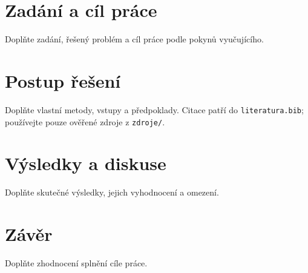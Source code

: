 \documentclass[a4paper,12pt]{article}
\begin{document}
\TitulniStrana

\section{Zadání a cíl práce}
Doplňte zadání, řešený problém a cíl práce podle pokynů vyučujícího.

\section{Postup řešení}
Doplňte vlastní metody, vstupy a předpoklady. Citace patří do
\texttt{literatura.bib}; používejte pouze ověřené zdroje z \texttt{zdroje/}.

\section{Výsledky a diskuse}
Doplňte skutečné výsledky, jejich vyhodnocení a omezení.

\section{Závěr}
Doplňte zhodnocení splnění cíle práce.



\end{document}
